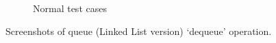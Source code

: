 \begin{figure}[!ht]
\begin{subfigure}{0.34\textwidth}
		\caption{Normal test cases}\label{fig:queue_ll_pop_normal}
	\end{subfigure}
	\caption{Screenshots of queue (Linked List version) `dequeue' operation.}\label{fig:queue_ll_pop_cases}
\end{figure}